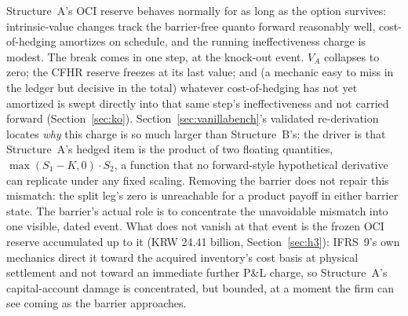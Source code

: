 \documentclass[11pt,a4paper]{article}
\begin{document}
Structure~A's OCI reserve behaves normally for as long as the option survives: intrinsic-value changes track the barrier-free quanto forward reasonably well, cost-of-hedging amortizes on schedule, and the running ineffectiveness charge is modest. The break comes in one step, at the knock-out event. $V_A$ collapses to zero; the CFHR reserve freezes at its last value; and (a mechanic easy to miss in the ledger but decisive in the total) whatever cost-of-hedging has not yet amortized is swept directly into that same step's ineffectiveness and not carried forward (Section~\ref{sec:ko}). Section~\ref{sec:vanillabench}'s validated re-derivation locates \emph{why} this charge is so much larger than Structure~B's: the driver is that Structure~A's hedged item is the product of two floating quantities, $\max(S_1-K,0)\cdot S_2$, a function that no forward-style hypothetical derivative can replicate under any fixed scaling. Removing the barrier does not repair this mismatch: the split leg's zero is unreachable for a product payoff in either barrier state. The barrier's actual role is to concentrate the unavoidable mismatch into one visible, dated event. What does not vanish at that event is the frozen OCI reserve accumulated up to it (KRW 24.41 billion, Section~\ref{sec:h3}): IFRS~9's own mechanics direct it toward the acquired inventory's cost basis at physical settlement and not toward an immediate further P\&L charge, so Structure~A's capital-account damage is concentrated, but bounded, at a moment the firm can see coming as the barrier approaches.
\end{document}
